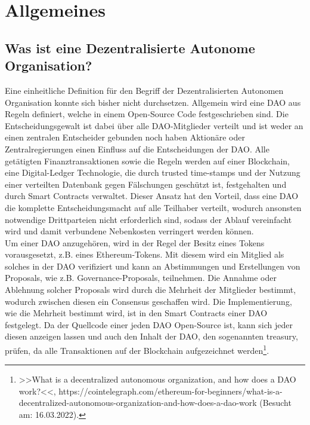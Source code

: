 \documentclass[a4paper,12pt]{report}
\begin{document}
    \section{Allgemeines}
    \startsection
        \subsection{Was ist eine Dezentralisierte Autonome Organisation?}
        \startsubsection
            Eine einheitliche Definition für den Begriff der Dezentralisierten Autonomen Organisation konnte sich bisher nicht durchsetzen. Allgemein wird eine DAO aus Regeln definiert, welche in einem Open-Source Code festgeschrieben sind. Die Entscheidungsgewalt ist dabei über alle DAO-Mitglieder verteilt und ist weder an einen zentralen Entscheider gebunden noch haben Aktionäre oder Zentralregierungen einen Einfluss auf die Entscheidungen der DAO. Alle getätigten Finanztransaktionen sowie die Regeln werden auf einer Blockchain, eine Digital-Ledger Technologie, die durch trusted time-stamps und der Nutzung einer verteilten Datenbank gegen Fälschungen geschützt ist, festgehalten und durch Smart Contracts verwaltet. Dieser Ansatz hat den Vorteil, dass eine DAO die komplette Entscheidungsmacht auf alle Teilhaber verteilt, wodurch ansonsten notwendige Drittparteien nicht erforderlich sind, sodass der Ablauf vereinfacht wird und damit verbundene Nebenkosten verringert werden können. \\
            Um einer DAO anzugehören, wird in der Regel der Besitz eines Tokens vorausgesetzt, z.B. eines Ethereum-Tokens. Mit diesem wird ein Mitglied als solches in der DAO verifiziert und kann an Abstimmungen und Erstellungen von Proposals, wie z.B. Governance-Proposals, teilnehmen. Die Annahme oder Ablehnung solcher Proposals wird durch die Mehrheit der Mitglieder bestimmt, wodurch zwischen diesen ein Consensus geschaffen wird. Die Implementierung, wie die Mehrheit bestimmt wird, ist in den Smart Contracts einer DAO festgelegt. Da der Quellcode einer jeden DAO Open-Source ist, kann sich jeder diesen anzeigen lassen und auch den Inhalt der DAO, den sogenannten treasury, prüfen, da alle Transaktionen auf der Blockchain aufgezeichnet werden\footnote{\hspace{0.5em}\begin{minipage}[t]{13cm}>>What is a decentralized autonomous organization, and how does a DAO work?<<, https://cointelegraph.com/ethereum-for-beginners/what-is-a-decentralized-autonomous-organization-and-how-does-a-dao-work (Besucht am: 16.03.2022).\end{minipage}}.
        \closesection
\end{document}
